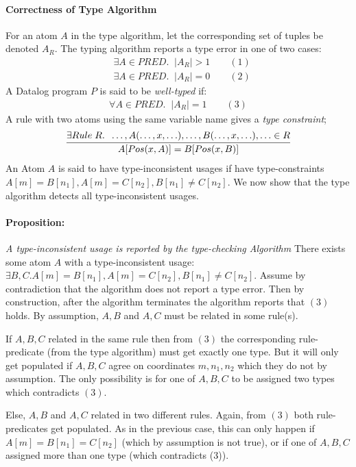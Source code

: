 \paragraph{Correctness of Type Algorithm}\NL
For an atom $A$ in the type algorithm, let the corresponding set of tuples be denoted $A_R$. The typing algorithm reports a type error in one of two cases:
\begin{align*}
&\exists A \in PRED.\;\;|A_R| > 1 \quad\quad (1)\\
&\exists A \in PRED.\;\;|A_R| = 0 \quad\quad (2)
\end{align*}
\noindent
A Datalog program $P$ is said to be \textit{well-typed} if:
\begin{align*}
\forall A \in PRED. \;\; |A_R| = 1 \quad\quad (3)
\end{align*}
A rule with two atoms using the same variable name gives a \textit{type constraint};
\begin{align*}
\infer{A[Pos(x, A)] = B[Pos(x, B)]}{\exists Rule\;R.\;\;\ldots, A( \ldots, x, \ldots), \ldots, B(\ldots, x, \ldots), \ldots \in R}
\end{align*}
\noindent
An Atom $A$ is said to have type-inconsistent usages if have type-constraints $A[m] = B[n_1], A[m] = C[n_2], B[n_1] \neq C[n_2]$. We now show that the type algorithm detects all type-inconsistent usages.

\paragraph{Proposition: } \textit{A type-inconsistent usage is reported by the type-checking Algorithm}\NL
There exists some atom $A$ with a type-inconsistent usage: $\exists B, C. A[m] = B[n_1], A[m] = C[n_2], B[n_1] \neq C[n_2]$. Assume by contradiction that the algorithm does not report a type error. Then by construction, after the algorithm terminates the algorithm reports that $(3)$ holds. By assumption, $A, B$ and $A, C$ must be related in some rule(s). 

If $A,B,C$ related in the same rule then from $(3)$ the corresponding rule-predicate (from the type algorithm) must get exactly one type. But it will only get populated if $A,B,C$ agree on coordinates $m, n_1, n_2$ which they do not by assumption. The only possibility is for one of $A,B,C$ to be assigned two types which contradicts $(3)$.

Else, $A,B$ and $A,C$ related in two different rules. Again, from $(3)$ both rule-predicates get populated. As in the previous case, this can only happen if $A[m] = B[n_1] = C[n_2]$ (which by assumption is not true), or if one of $A,B,C$ assigned more than one type (which contradicts (3)). 

